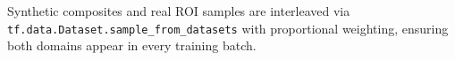 Synthetic composites and real ROI samples are interleaved via
\texttt{tf.data.Dataset.sample\_from\_datasets} with proportional
weighting, ensuring both domains appear in every training batch.


